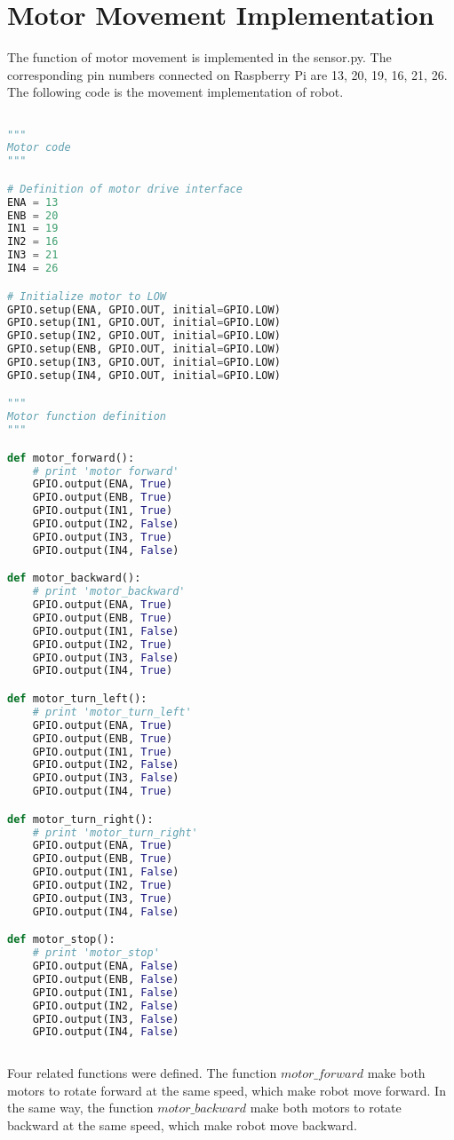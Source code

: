 \documentclass[11pt,times,oneside,openright,hardcopy]{eeereport}
\begin{document}
\section{Motor Movement Implementation}
The function of motor movement is implemented in the sensor.py. The corresponding pin numbers connected on Raspberry Pi are 13, 20, 19, 16, 21, 26.
The following code is the movement implementation of robot.
\begin{lstlisting}[language=Python]

"""
Motor code
"""

# Definition of motor drive interface
ENA = 13
ENB = 20
IN1 = 19
IN2 = 16
IN3 = 21
IN4 = 26

# Initialize motor to LOW
GPIO.setup(ENA, GPIO.OUT, initial=GPIO.LOW)
GPIO.setup(IN1, GPIO.OUT, initial=GPIO.LOW)
GPIO.setup(IN2, GPIO.OUT, initial=GPIO.LOW)
GPIO.setup(ENB, GPIO.OUT, initial=GPIO.LOW)
GPIO.setup(IN3, GPIO.OUT, initial=GPIO.LOW)
GPIO.setup(IN4, GPIO.OUT, initial=GPIO.LOW)

"""
Motor function definition
"""

def motor_forward():
    # print 'motor forward'
    GPIO.output(ENA, True)
    GPIO.output(ENB, True)
    GPIO.output(IN1, True)
    GPIO.output(IN2, False)
    GPIO.output(IN3, True)
    GPIO.output(IN4, False)

def motor_backward():
    # print 'motor_backward'
    GPIO.output(ENA, True)
    GPIO.output(ENB, True)
    GPIO.output(IN1, False)
    GPIO.output(IN2, True)
    GPIO.output(IN3, False)
    GPIO.output(IN4, True)

def motor_turn_left():
    # print 'motor_turn_left'
    GPIO.output(ENA, True)
    GPIO.output(ENB, True)
    GPIO.output(IN1, True)
    GPIO.output(IN2, False)
    GPIO.output(IN3, False)
    GPIO.output(IN4, True)

def motor_turn_right():
    # print 'motor_turn_right'
    GPIO.output(ENA, True)
    GPIO.output(ENB, True)
    GPIO.output(IN1, False)
    GPIO.output(IN2, True)
    GPIO.output(IN3, True)
    GPIO.output(IN4, False)

def motor_stop():
    # print 'motor_stop'
    GPIO.output(ENA, False)
    GPIO.output(ENB, False)
    GPIO.output(IN1, False)
    GPIO.output(IN2, False)
    GPIO.output(IN3, False)
    GPIO.output(IN4, False)
    
\end{lstlisting}
Four related functions were defined. 
The function $motor\_forward$ make both motors to rotate forward at the same speed, which make robot move forward.
In the same way, the function $motor\_backward$ make both motors to rotate backward at the same speed, which make robot move backward.
\end{document}
